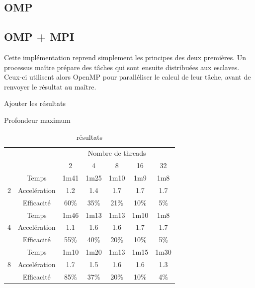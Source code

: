 \documentclass[12pt]{article}
\begin{document}
    \subsection{OMP}
    \subsection{OMP + MPI}
    Cette implémentation reprend simplement 
    les principes des deux premières. Un processus maître prépare des tâches
    qui sont ensuite distribuées aux esclaves. Ceux-ci utilisent alors OpenMP
    pour paralléliser le calcul de leur tâche, avant de renvoyer le résultat
    au maître.\\
    \par {\color{red} Ajouter les résultats}
    \begin{table} \begin{center}
        \begin{sideways} \hspace{-2.4cm}Profondeur maximum \end{sideways}
        \begin{tabular}{|c|c|c|c|c|c|c|}
            \multicolumn{2}{c}{} & \multicolumn{5}{c}{Nombre de threads} \\
            \cline{3-7}
            \multicolumn{2}{c|}{} & 2 & 4 & 8 & 16 & 32 \\
            \hline
            \multirow{3}{*}{2} & Temps          & 1m41 & 1m25 & 1m10 & 1m9  & 1m8 \\
            \cline{2-7}
                              & Accelération    & 1.2  & 1.4  & 1.7  & 1.7  & 1.7 \\
            \cline{2-7}
                              & Efficacité      & 60\% & 35\% & 21\% & 10\% & 5\% \\
            \hline \hline
            \multirow{3}{*}{4} & Temps          & 1m46 & 1m13 & 1m13 & 1m10 & 1m8 \\
            \cline{2-7}
                              & Accelération    & 1.1  & 1.6  & 1.6  & 1.7  & 1.7 \\
            \cline{2-7}
                              & Efficacité      & 55\% & 40\% & 20\% & 10\% & 5\% \\
            \hline \hline
            \multirow{3}{*}{8} & Temps          & 1m10 & 1m20 & 1m13 & 1m15 & 1m30 \\
            \cline{2-7}
                              & Accelération    & 1.7  & 1.5  & 1.6  & 1.6  & 1.3  \\
            \cline{2-7}
                              & Efficacité      & 85\% & 37\% & 20\% & 10\% & 4\%  \\
            \hline
        \end{tabular}
        \caption{\label{tab:omp1}\color{red} résultats}
    \end{center} \end{table}
\end{document}
